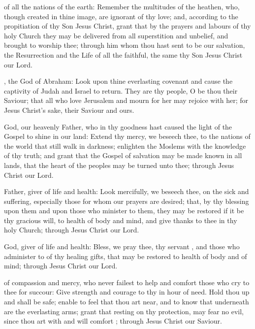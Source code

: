  of all the nations of the earth: Remember the multitudes of the heathen, who, though created in thine image, are ignorant of thy love; and, according to the propitiation of thy Son Jesus Christ, grant that by the prayers and labours of thy holy Church they may be delivered from all superstition and unbelief, and brought to worship thee; through him whom thou hast sent to be our salvation, the Resurrection and the Life of all the faithful, the same thy Son Jesus Christ our Lord.

, the God of Abraham: Look upon thine everlasting covenant and cause the captivity of Judah and Israel to return. They are thy people, O be thou their Saviour; that all who love Jerusalem and mourn for her may rejoice with her; for Jesus Christ's sake, their Saviour and ours.

 God, our heavenly Father, who in thy goodness hast caused the light of the Gospel to shine in our land: Extend thy mercy, we beseech thee, to the nations of the world that still walk in darkness; enlighten the Moslems with the knowledge of thy truth; and grant that the Gospel of salvation may be made known in all lands, that the heart of the peoples may be turned unto thee; through Jesus Christ our Lord.

 Father, giver of life and health: Look mercifully, we beseech thee, on the sick and suffering, especially those for whom our prayers are desired; that, by thy blessing upon them and upon those who minister to them, they may be restored if it be thy gracious will, to health of body and mind, and give thanks to thee in thy holy Church; through Jesus Christ our Lord.

 God, giver of life and health: Bless, we pray thee, thy servant , and those who administer to  of thy healing gifts, that  may be restored to health of body and of mind; through Jesus Christ our Lord.

 of compassion and mercy, who never failest to help and comfort those who cry to thee for succour: Give strength and courage to thy   in  hour of need. Hold thou  up and  shall be safe; enable  to feel that thou art near, and to know that underneath are the everlasting arms; grant that resting on thy protection,  may fear no evil, since thou art with  and will comfort ; through Jesus Christ our Saviour.

